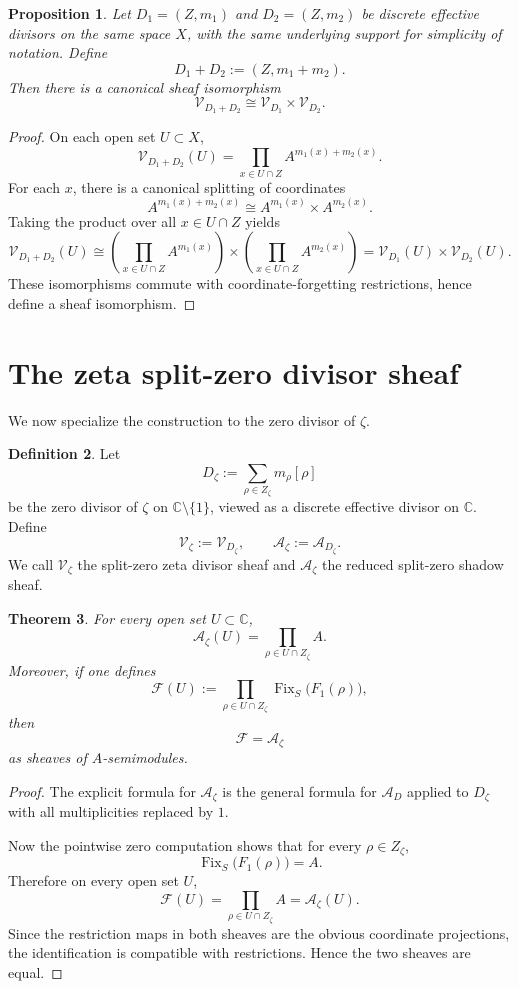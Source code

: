 \documentclass[11pt,a4paper]{article}
\newtheorem{theorem}{Theorem}[section]
\newtheorem{proposition}[theorem]{Proposition}
\theoremstyle{definition}
\newtheorem{definition}[theorem]{Definition}
\theoremstyle{remark}
\DeclareMathOperator{\Fix}{Fix}
\newcommand{\CC}{\mathbb C}
\begin{document}
\begin{proposition}
Let \(D_1=(Z,m_1)\) and \(D_2=(Z,m_2)\) be discrete effective divisors on the same space \(X\), with the same underlying support for simplicity of notation. Define
\[
D_1+D_2:=(Z,m_1+m_2).
\]
Then there is a canonical sheaf isomorphism
\[
\mathcal V_{D_1+D_2}\cong \mathcal V_{D_1}\times \mathcal V_{D_2}.
\]
\end{proposition}

\begin{proof}
On each open set \(U\subset X\),
\[
\mathcal V_{D_1+D_2}(U)=\prod_{x\in U\cap Z}A^{m_1(x)+m_2(x)}.
\]
For each \(x\), there is a canonical splitting of coordinates
\[
A^{m_1(x)+m_2(x)}\cong A^{m_1(x)}\times A^{m_2(x)}.
\]
Taking the product over all \(x\in U\cap Z\) yields
\[
\mathcal V_{D_1+D_2}(U)
\cong
\left(\prod_{x\in U\cap Z}A^{m_1(x)}\right)
\times
\left(\prod_{x\in U\cap Z}A^{m_2(x)}\right)
=\mathcal V_{D_1}(U)\times\mathcal V_{D_2}(U).
\]
These isomorphisms commute with coordinate-forgetting restrictions, hence define a sheaf isomorphism.
\end{proof}

\section{The zeta split-zero divisor sheaf}

We now specialize the construction to the zero divisor of \(\zeta\).

\begin{definition}
Let
\[
D_\zeta:=\sum_{\rho\in Z_\zeta}m_\rho[\rho]
\]
be the zero divisor of \(\zeta\) on \(\CC\setminus\{1\}\), viewed as a discrete effective divisor on \(\CC\).
Define
\[
\mathcal V_\zeta:=\mathcal V_{D_\zeta},
\qquad
\mathcal A_\zeta:=\mathcal A_{D_\zeta}.
\]
We call \(\mathcal V_\zeta\) the split-zero zeta divisor sheaf and \(\mathcal A_\zeta\) the reduced split-zero shadow sheaf.
\end{definition}

\begin{theorem}
For every open set \(U\subset\CC\),
\[
\mathcal A_\zeta(U)=\prod_{\rho\in U\cap Z_\zeta}A.
\]
Moreover, if one defines
\[
\mathcal F(U):=\prod_{\rho\in U\cap Z_\zeta}\Fix_S\bigl(F_1(\rho)\bigr),
\]
then
\[
\mathcal F=\mathcal A_\zeta
\]
as sheaves of \(A\)-semimodules.
\end{theorem}

\begin{proof}
The explicit formula for \(\mathcal A_\zeta\) is the general formula for \(\mathcal A_D\) applied to \(D_\zeta\) with all multiplicities replaced by \(1\).

Now the pointwise zero computation shows that for every \(\rho\in Z_\zeta\),
\[
\Fix_S\bigl(F_1(\rho)\bigr)=A.
\]
Therefore on every open set \(U\),
\[
\mathcal F(U)=\prod_{\rho\in U\cap Z_\zeta}A=\mathcal A_\zeta(U).
\]
Since the restriction maps in both sheaves are the obvious coordinate projections, the identification is compatible with restrictions. Hence the two sheaves are equal.
\end{proof}
\end{document}
